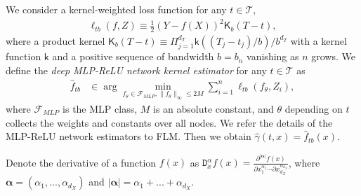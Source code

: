 \documentclass[lettersize, 12pt]{article}
\begin{document}
We consider a kernel-weighted loss function for any $t\in\mathcal{T}$,
\begin{align*}
\ell_{tb}(f, Z) \equiv \frac{1}{2}\left(Y- f(X)\right)^2 \mathsf{K}_b\left(T- t\right),
\end{align*} 
where a product kernel $\mathsf{K}_b(T-t) \equiv \Pi_{j=1}^{d_T} \mathsf{k}((T_j - t_j)/b)/b^{d_T}$ 
with a kernel function $\mathsf{k}$ and a positive sequence of bandwidth $b = b_n$ vanishing as $n$ grows. 
We define the {\it deep MLP-ReLU network kernel estimator} for any $t\in\mathcal{T}$ as
\begin{align}
\hat f_{tb} &\in \arg\min_{f_\theta \in \mathcal{F}_{MLP}, \|f_\theta\|_\infty \leq 2M} \sum_{i=1}^n \ell_{tb}(f_\theta, Z_i),
\label{EstDNN}
\end{align}
where 
$\mathcal{F}_{MLP}$ is the MLP class, $M$ is an absolute constant, and $\theta$ depending on $t$ collects the weights and constants over all nodes.
We refer the details of the MLP-ReLU network estimators to FLM.
Then we obtain $\hat \gamma(t, x) = \hat f_{tb}(x)$.

Denote the derivative of a function $f(x)$ as $\mathtt{D}^{\alpha}_x f(x) = \frac{\partial^{|\bm{\alpha}|} f(x)}{\partial x_1^{\alpha_1}\cdots \partial x_{d_X}^{\alpha_{d_X}}}$, where $\bm{\alpha} = (\alpha_1,...,\alpha_{d_X})$ and $|\bm{\alpha}| = \alpha_1 +...+\alpha_{d_X}$.
\end{document}
